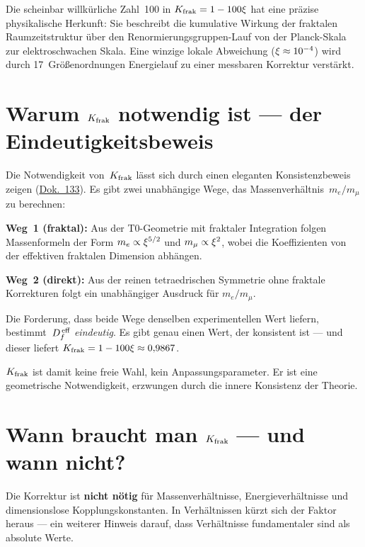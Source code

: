 \begin{kerngedanke}
Die scheinbar willkürliche Zahl~100 in $K_{\text{frak}} = 1 - 100\xi$ hat eine präzise physikalische Herkunft: Sie beschreibt die kumulative Wirkung der fraktalen Raumzeitstruktur über den Renormierungsgruppen-Lauf von der Planck-Skala zur elektroschwachen Skala. Eine winzige lokale Abweichung ($\xi \approx 10^{-4}$) wird durch 17~Größenordnungen Energielauf zu einer messbaren Korrektur verstärkt.
\end{kerngedanke}

\section{Warum $K_{\text{frak}}$ notwendig ist --- der Eindeutigkeitsbeweis}

Die Notwendigkeit von~$K_{\text{frak}}$ lässt sich durch einen eleganten Konsistenzbeweis zeigen (\href{https://github.com/jpascher/T0-Time-Mass-Duality/blob/main/2/pdf/133_Fraktale_Korrektur_Herleitung_De.pdf}{Dok.~133}). Es gibt zwei unabhängige Wege, das Massenverhältnis~$m_e/m_\mu$ zu berechnen:

\textbf{Weg~1 (fraktal):} Aus der T0-Geometrie mit fraktaler Integration folgen Massenformeln der Form $m_e \propto \xi^{5/2}$ und $m_\mu \propto \xi^2$, wobei die Koeffizienten von der effektiven fraktalen Dimension abhängen.

\textbf{Weg~2 (direkt):} Aus der reinen tetraedrischen Symmetrie ohne fraktale Korrekturen folgt ein unabhängiger Ausdruck für $m_e/m_\mu$.

Die Forderung, dass beide Wege denselben experimentellen Wert liefern, bestimmt~$D_f^{\,\text{eff}}$ \emph{eindeutig}. Es gibt genau einen Wert, der konsistent ist --- und dieser liefert $K_{\text{frak}} = 1 - 100\xi \approx 0{,}9867$.

$K_{\text{frak}}$ ist damit keine freie Wahl, kein Anpassungsparameter. Er ist eine geometrische Notwendigkeit, erzwungen durch die innere Konsistenz der Theorie.

\section{Wann braucht man $K_{\text{frak}}$ --- und wann nicht?}

Die Korrektur ist \textbf{nicht nötig} für Massenverhältnisse, Energieverhältnisse und dimensionslose Kopplungskonstanten. In Verhältnissen kürzt sich der Faktor heraus --- ein weiterer Hinweis darauf, dass Verhältnisse fundamentaler sind als absolute Werte.

